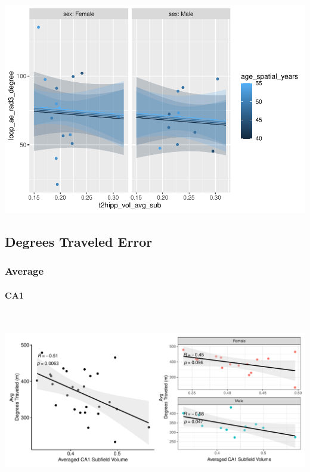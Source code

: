 \documentclass[
]{article}
\begin{document}
\includegraphics{hippocampal_subfield_files/figure-latex/Avg SUB + rad3 angular errorMLR-1.pdf}
\vspace{1cm}

\newpage

\subsection{Degrees Traveled Error}
\vspace{1cm}

\subsubsection{Average}

\paragraph{CA1}

~ \vspace{1cm}

\includegraphics{hippocampal_subfield_files/figure-latex/unnamed-chunk-15-1.pdf}
\end{document}
